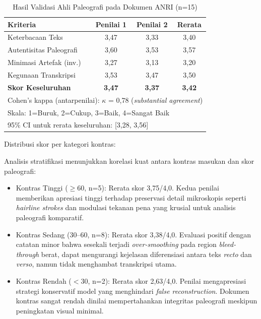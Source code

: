 \documentclass[journal]{IEEEtran}
\begin{document}
\begin{table}[!t]
\renewcommand{\arraystretch}{1.3}
\caption{Hasil Validasi Ahli Paleografi pada Dokumen ANRI (n=15)}
\label{table:anri_expert_validation}
\centering
\small
\begin{tabular}{|l|c|c|c|}
\hline
\textbf{Kriteria} & \textbf{Penilai 1} & \textbf{Penilai 2} & \textbf{Rerata} \\
\hline
Keterbacaan Teks & 3,47 & 3,33 & 3,40 \\
Autentisitas Paleografi & 3,60 & 3,53 & 3,57 \\
Minimasi Artefak (inv.) & 3,27 & 3,13 & 3,20 \\
Kegunaan Transkripsi & 3,53 & 3,47 & 3,50 \\
\hline
\textbf{Skor Keseluruhan} & \textbf{3,47} & \textbf{3,37} & \textbf{3,42} \\
\hline
\multicolumn{4}{l}{\footnotesize Cohen's kappa (antarpenilai): $\kappa$ = 0,78 (\textit{substantial agreement})} \\
\multicolumn{4}{l}{\footnotesize Skala: 1=Buruk, 2=Cukup, 3=Baik, 4=Sangat Baik} \\
\multicolumn{4}{l}{\footnotesize 95\% CI untuk rerata keseluruhan: [3,28, 3,56]} \\
\end{tabular}
\end{table}

Distribusi skor per kategori kontras:

Analisis stratifikasi menunjukkan korelasi kuat antara kontras masukan dan skor paleografi:

\begin{itemize}
    \item Kontras Tinggi ($\geq$60, n=5): Rerata skor 3,75/4,0. Kedua penilai memberikan apresiasi tinggi terhadap preservasi detail mikroskopis seperti \textit{hairline strokes} dan modulasi tekanan pena yang krusial untuk analisis paleografi komparatif.
    
    \item Kontras Sedang (30--60, n=8): Rerata skor 3,38/4,0. Evaluasi positif dengan catatan minor bahwa sesekali terjadi \textit{over-smoothing} pada region \textit{bleed-through} berat, dapat mengurangi kejelasan diferensiasi antara teks \textit{recto} dan \textit{verso}, namun tidak menghambat transkripsi utama.
    
    \item Kontras Rendah ($<$30, n=2): Rerata skor 2,63/4,0. Penilai mengapresiasi strategi konservatif model yang menghindari \textit{false reconstruction}. Dokumen kontras sangat rendah dinilai mempertahankan integritas paleografi meskipun peningkatan visual minimal.
\end{itemize}
\end{document}
